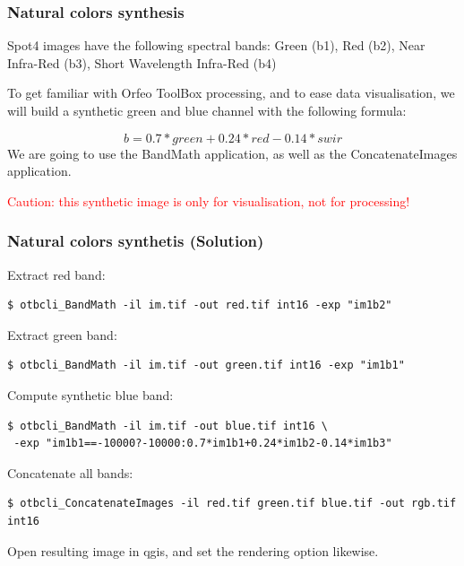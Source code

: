\documentclass[8pt]{beamer}
\begin{document}
\begin{frame}
\frametitle{Natural colors synthesis} 
Spot4 images have the following spectral bands: Green (b1), Red (b2), Near Infra-Red (b3), Short Wavelength Infra-Red (b4)

To get familiar with Orfeo ToolBox processing, and to ease data
visualisation, we will build a synthetic green and blue channel with the following formula:

\begin{equation}
b=0.7*green+0.24*red-0.14*swir
\end{equation}
We are going to use the BandMath application, as well as the ConcatenateImages application.

\textcolor{red}{Caution: this synthetic image is only for visualisation, not for processing!}

\end{frame}
\begin{frame}[fragile]
\frametitle{Natural colors synthetis (Solution)}
Extract red band:
\begin{verbatim}
$ otbcli_BandMath -il im.tif -out red.tif int16 -exp "im1b2"
\end{verbatim}
Extract green band:
\begin{verbatim}
$ otbcli_BandMath -il im.tif -out green.tif int16 -exp "im1b1"
\end{verbatim}
Compute synthetic blue band:
\begin{verbatim}
$ otbcli_BandMath -il im.tif -out blue.tif int16 \
 -exp "im1b1==-10000?-10000:0.7*im1b1+0.24*im1b2-0.14*im1b3"
\end{verbatim}
Concatenate all bands:
\begin{verbatim}
$ otbcli_ConcatenateImages -il red.tif green.tif blue.tif -out rgb.tif int16
\end{verbatim}

Open resulting image in qgis, and set the rendering option likewise.

\end{frame}
\end{document}
